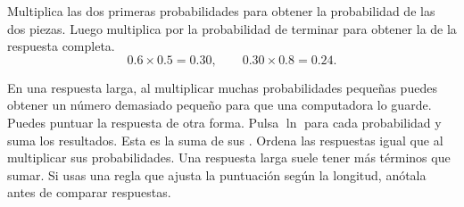 {Multiplica las dos primeras probabilidades para obtener la probabilidad de las dos piezas. Luego multiplica por la probabilidad de terminar para obtener la de la respuesta completa.}
\[0.6\times0.5=0.30,\qquad 0.30\times0.8=0.24.\]

{En una respuesta larga, al multiplicar muchas probabilidades pequeñas puedes obtener un número demasiado pequeño para que una computadora lo guarde. Puedes puntuar la respuesta de otra forma. Pulsa \(\ln\) para cada probabilidad y suma los resultados. Esta es la suma de sus . Ordena las respuestas igual que al multiplicar sus probabilidades. Una respuesta larga suele tener más términos que sumar. Si usas una regla que ajusta la puntuación según la longitud, anótala antes de comparar respuestas.}

\section{}

